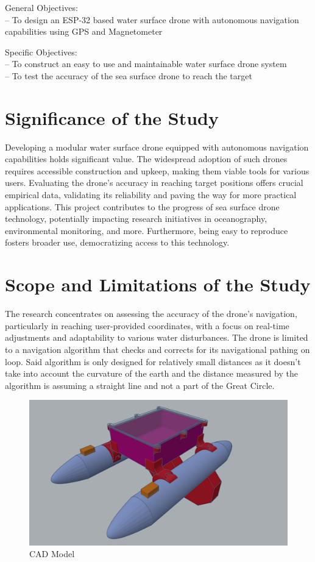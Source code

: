 General Objectives: \\
\indent -- To design an ESP-32 based water surface drone with autonomous navigation capabilities using GPS and Magnetometer

Specific Objectives: \\
\indent -- To construct an easy to use and maintainable water surface drone system \\
\indent -- To test the accuracy of the sea surface drone to reach the target 

\section{Significance of the Study}
Developing a modular water surface drone equipped with autonomous navigation capabilities holds significant value. The widespread adoption of
such drones requires accessible construction and upkeep, making them viable tools for various users. Evaluating the drone's accuracy in reaching
target positions offers crucial empirical data, validating its reliability and paving the way for more practical applications. This project 
contributes to the progress of sea surface drone technology, potentially impacting research initiatives in oceanography, environmental monitoring, 
and more. Furthermore, being easy to reproduce fosters broader use, democratizing access to this technology.

\section{Scope and Limitations of the Study}
The research concentrates on assessing the accuracy of the drone's navigation, particularly in reaching user-provided coordinates, with a focus
on real-time adjustments and adaptability to various water disturbances.  The drone is limited to a navigation algorithm that checks and corrects
for its navigational pathing on loop. Said algorithm is only designed for relatively small distances as it doesn't take into account the curvature 
of the earth and the distance measured by the algorithm is assuming a straight line and not a part of the Great Circle.

\vspace{0.5cm}
\begin{figure}[ht]
\centering
\includegraphics[scale = 0.60]{assets/3d_model_complete.png}
\caption{CAD Model}
\label{fig:3dModelComplete}
\end{figure}

